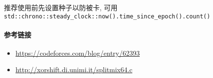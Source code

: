 推荐使用前先设置种子以防被卡, 可用 \verb|std::chrono::steady_clock::now().time_since_epoch().count()|

\paragraph{参考链接}

\begin{itemize}
    \item \url{https://codeforces.com/blog/entry/62393}
    \item \url{http://xorshift.di.unimi.it/splitmix64.c}
\end{itemize}